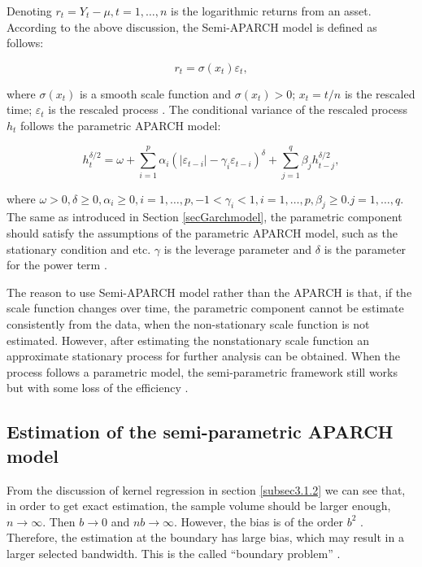 Denoting $r_{t}= Y_t-\mu,t=1, \ldots,n$ is the logarithmic returns from an asset. According to the above discussion, the Semi-APARCH model is defined as follows:

\begin{equation}
r_{t} = \sigma(x_t)\varepsilon_{t},
\end{equation}

where $\sigma(x_t)$ is a smooth scale function and $\sigma(x_t) >0$; $x_t = t/n$ is the rescaled time;  $\varepsilon_{t}$ is the rescaled process \citep{Feng2004}. The conditional variance of the rescaled process $h_{t}$ follows the parametric APARCH model:
    

\begin{equation}
h_{t}^{\delta/2} = \omega + \sum_{i=1}^{p} \alpha_{i}(|\varepsilon_{t-i}|-\gamma_{i}\varepsilon_{t-i})^{\delta} + \sum_{j=1}^{q}\beta_{j}h_{t-j}^{\delta/2},
\end{equation}

where $\omega>0, \delta\geq0, \alpha_{i}\geq0, i=1, \ldots, p, -1<\gamma_{i}<1, i=1, \ldots, p, \beta_{j}\geq0.j=1, \ldots, q$.
The same as introduced in Section \ref{secGarchmodel}, the parametric component should satisfy the assumptions of the parametric APARCH model, such as the stationary condition and etc. $\gamma$ is the leverage parameter and $\delta$  is the parameter for the power term \citep{Ding1993}.


The reason to use Semi-APARCH model rather than the APARCH is that, if the scale function changes over time, the parametric component cannot be estimate consistently from the data, when the non-stationary scale function is not estimated. However, after estimating the nonstationary scale function an approximate stationary process for further analysis can be obtained. When the process follows a parametric model, the semi-parametric framework still works but with some loss of the efficiency \citep{FengYuanhua;Sun2013}.

\subsection{ Estimation of the semi-parametric APARCH model}

From the discussion of kernel regression in section \ref{subsec3.1.2}  we can see that, in order to get exact estimation, the sample volume should be larger enough, $n\longrightarrow\infty$. Then  $b\longrightarrow0$ and $nb\longrightarrow\infty$. However, the bias is of the order $b^2$ . Therefore, the estimation at the boundary has large bias, which may result in a larger selected bandwidth. This is the called “boundary problem” \citep{Eubank1993}.


